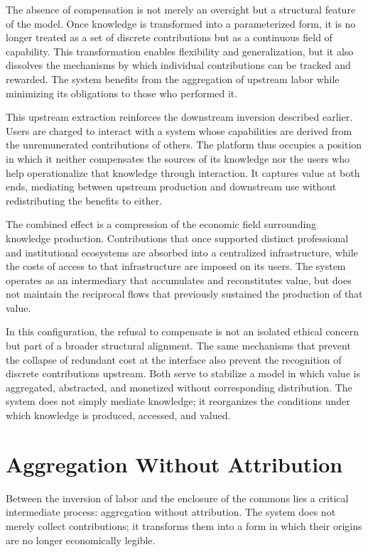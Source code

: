 \documentclass[12pt, oneside]{article}
\begin{document}
The absence of compensation is not merely an oversight but a structural feature of the model. Once knowledge is transformed into a parameterized form, it is no longer treated as a set of discrete contributions but as a continuous field of capability. This transformation enables flexibility and generalization, but it also dissolves the mechanisms by which individual contributions can be tracked and rewarded. The system benefits from the aggregation of upstream labor while minimizing its obligations to those who performed it.

This upstream extraction reinforces the downstream inversion described earlier. Users are charged to interact with a system whose capabilities are derived from the unremunerated contributions of others. The platform thus occupies a position in which it neither compensates the sources of its knowledge nor the users who help operationalize that knowledge through interaction. It captures value at both ends, mediating between upstream production and downstream use without redistributing the benefits to either.

The combined effect is a compression of the economic field surrounding knowledge production. Contributions that once supported distinct professional and institutional ecosystems are absorbed into a centralized infrastructure, while the costs of access to that infrastructure are imposed on its users. The system operates as an intermediary that accumulates and reconstitutes value, but does not maintain the reciprocal flows that previously sustained the production of that value.

In this configuration, the refusal to compensate is not an isolated ethical concern but part of a broader structural alignment. The same mechanisms that prevent the collapse of redundant cost at the interface also prevent the recognition of discrete contributions upstream. Both serve to stabilize a model in which value is aggregated, abstracted, and monetized without corresponding distribution. The system does not simply mediate knowledge; it reorganizes the conditions under which knowledge is produced, accessed, and valued.

\section{Aggregation Without Attribution}

Between the inversion of labor and the enclosure of the commons lies a critical intermediate process: aggregation without attribution. The system does not merely collect contributions; it transforms them into a form in which their origins are no longer economically legible.
\end{document}
